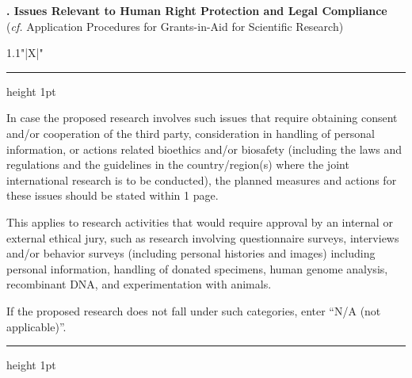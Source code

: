 \documentclass[8pt]{extarticle}
\makeatletter
\newcommand{\thickhline}{%
	\noalign {\ifnum 0=`}\fi \hrule height 1pt
	\futurelet \reserved@a \@xhline
}
\makeatother
\begin{document}
	
\noindent\textbf{\fontsize{12}{12}. Issues Relevant to Human Right Protection and Legal Compliance}\\
\indent (\textit{cf.} Application Procedures for Grants-in-Aid for Scientific Research)\\
\begin{tabularx}{1.1\linewidth}{"|X|"}
	\thickhline
	In case the proposed research involves such issues that require obtaining consent and/or cooperation of the third party, consideration in handling of personal information, or actions related bioethics and/or biosafety (including the laws and regulations and the guidelines in the country/region(s) where the joint international research is to be conducted), the planned measures and actions for these issues should be stated within 1 page.
	
	This applies to research activities that would require approval by an internal or external ethical jury, such as research involving questionnaire surveys, interviews and/or behavior surveys (including personal histories and images) including personal information, handling of donated specimens, human genome analysis, recombinant DNA, and experimentation with animals.
	
	If the proposed research does not fall under such categories, enter ``N/A (not applicable)''.
	\\
	\thickhline
\end{tabularx}
\end{document}
